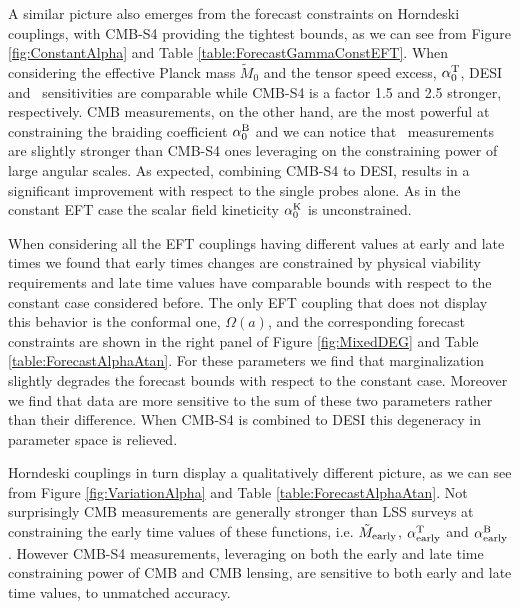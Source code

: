 A similar picture also emerges from the forecast constraints on Horndeski couplings, with CMB-S4 providing the tightest bounds, as we can see from Figure \ref{fig:ConstantAlpha} and Table \ref{table:ForecastGammaConstEFT}. 
When considering the effective Planck mass $\tilde{M}_0$ and the tensor speed excess, $\alpha_0^{\rm T}$, DESI and \planck\ sensitivities are comparable while CMB-S4 is a factor 1.5 and 2.5 stronger, respectively. 
CMB measurements, on the other hand, are the most powerful at constraining the braiding coefficient $\alpha_0^{\rm B}$ and we can notice that \planck\ measurements are slightly stronger than CMB-S4 ones leveraging on the constraining power of large angular scales. 
As expected, combining CMB-S4 to DESI, results in a significant improvement with respect to the single probes alone.
As in the constant EFT case the scalar field kineticity $\alpha_0^{\rm K}$ is unconstrained.

When considering all the EFT couplings having different values at early and late times we found that early times changes are constrained by physical viability requirements and late time values have comparable bounds with respect to the constant case considered before.
The only EFT coupling that does not display this behavior is the conformal one, $\Omega(a)$, and the corresponding forecast constraints are shown in the right panel of Figure \ref{fig:MixedDEG} and Table \ref{table:ForecastAlphaAtan}. For these parameters we find that marginalization slightly degrades the forecast bounds with respect to the constant case. Moreover we find that data are more sensitive to the sum of these two parameters rather than their difference. When CMB-S4 is combined to DESI this degeneracy in parameter space is relieved.

Horndeski couplings in turn display a qualitatively different picture, as we can see from Figure \ref{fig:VariationAlpha} and Table \ref{table:ForecastAlphaAtan}.
Not surprisingly CMB measurements are generally stronger than LSS surveys at constraining the early time values of these functions, i.e. $\tilde{M}_{\rm early}$, $\alpha^{\rm T}_{\rm early}$ and $\alpha^{\rm B}_{\rm early}$. However CMB-S4 measurements, leveraging on both the early and late time constraining power of CMB and CMB lensing, are sensitive to both early and late time values, to unmatched accuracy.


